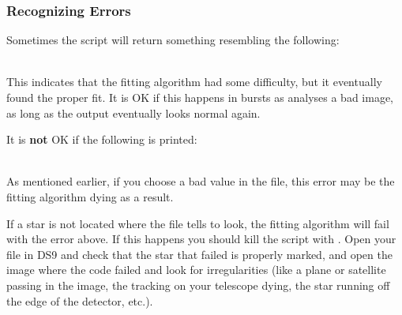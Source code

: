 \documentclass{article}
\begin{document}
\subsubsection{Recognizing Errors}
\label{sec:err}
Sometimes the script will return something resembling the following: \\

{\addtolength{\leftskip}{10 mm}
{\scriptsize
\noindent {}\\

	}
}

\noindent This indicates that the fitting algorithm had some difficulty, but it eventually found the proper fit. It is OK if this happens in bursts as \oscaar  analyses a bad image, as long as the output eventually looks normal again. 

It is \textbf{not} OK if the following is printed: \\

{\addtolength{\leftskip}{10 mm}
{\scriptsize
\noindent {}\\

	}
}

\noindent As mentioned earlier, if you choose a bad  value in the  file, this error may be the fitting algorithm dying as a result. 

	If a star is not located where the  file tells \oscaar  to look, the fitting algorithm will fail with the error above. If this happens you should kill the script with . Open your  file in DS9 and check that the star that failed is properly marked, and open the image where the code failed and look for irregularities (like a plane or satellite passing in the image, the tracking on your telescope dying, the star running off the edge of the detector, etc.).
\end{document}
